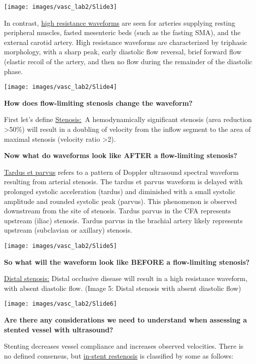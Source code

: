\documentclass[
]{book}
\begin{document}
\texttt{[image: images/vasc\_lab2/Slide3]}

In contrast, \uline{high resistance waveforms} are seen for
arteries supplying resting peripheral muscles, fasted mesenteric beds
(such as the fasting SMA), and the external carotid artery. High
resistance waveforms are characterized by triphasic morphology, with a
sharp peak, early diastolic flow reversal, brief forward flow (elastic
recoil of the artery, and then no flow during the remainder of the
diastolic phase.

\texttt{[image: images/vasc\_lab2/Slide4]}

\textbf{How does flow-limiting stenosis change the waveform?}

First let's define \uline{Stenosis:}~A hemodynamically significant
stenosis (area reduction \textgreater50\%) will result in a doubling of velocity
from the inflow segment to the area of maximal stenosis (velocity ratio
\textgreater2).

\textbf{Now what do waveforms look like AFTER a flow-limiting stenosis?}

\uline{Tardus et parvus} refers to a pattern of Doppler ultrasound
spectral waveform resulting from arterial stenosis. The tardus et parvus
waveform is delayed with prolonged systolic acceleration (tardus) and
diminished with a small systolic amplitude and rounded systolic peak
(parvus). This phenomenon is observed downstream from the site of
stenosis. Tardus parvus in the CFA represents upstream (iliac) stenosis.
Tardus parvus in the brachial artery likely represents upstream
(subclavian or axillary) stenosis.\citep{hwang2017, pellerito2019}

\texttt{[image: images/vasc\_lab2/Slide5]}

\textbf{So what will the waveform look like BEFORE a flow-limiting stenosis?}

\uline{Distal stenosis:} Distal occlusive disease will result in a
high resistance waveform, with absent diastolic flow. (Image 5: Distal
stenosis with absent diastolic flow)

\texttt{[image: images/vasc\_lab2/Slide6]}

\textbf{Are there any considerations we need to understand when assessing a
stented vessel with ultrasound?}

Stenting decreases vessel compliance and increases observed velocities.
There is no defined consensus, but \uline{in-stent restenosis} is
classified by some as follows:
\end{document}
